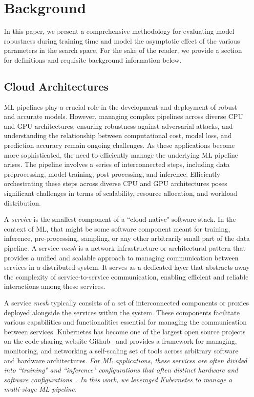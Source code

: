 \documentclass[conference]{IEEEtran}
\newcommand{\cm}[1]{\textit{{\color{blue}#1}}}
\begin{document}
\section{Background}
\label{background}



In this paper, we present a comprehensive methodology for evaluating model robustness during training time and model the asymptotic effect of the various parameters in the search space. For the sake of the reader, we provide a section for definitions and requisite background information below.


\subsection{Cloud Architectures}


ML pipelines play a crucial role in the development and deployment of robust and accurate models. However, managing complex pipelines across diverse CPU and GPU architectures, ensuring robustness against adversarial attacks, and understanding the relationship between computational cost, model loss, and prediction accuracy remain ongoing challenges.
As these applications become more sophisticated, the need to efficiently manage the underlying ML pipeline arises. The pipeline involves a series of interconnected steps, including data preprocessing, model training, post-processing, and inference. Efficiently orchestrating these steps across diverse CPU and GPU architectures poses significant challenges in terms of scalability, resource allocation, and workload distribution.

A \textit{service} is the smallest component of a ``cloud-native" software stack. In the context of ML, that might be some software component meant for training, inference, pre-processing, sampling, or any other arbitrarily small part of the data pipeline. A service \textit{mesh} is a network infrastructure or architectural pattern that provides a unified and scalable approach to managing communication between services in a distributed system. It serves as a dedicated layer that abstracts away the complexity of service-to-service communication, enabling efficient and reliable interactions among these services. 

A service \textit{mesh} typically consists of a set of interconnected components or proxies deployed alongside the services within the system. These components facilitate various capabilities and functionalities essential for managing the communication between services. Kubernetes has become one of the largest open source projects on the code-sharing website Github~\cite{k8s-size} and provides a framework for managing, monitoring, and networking a self-scaling set of tools across arbitrary software and hardware architectures. \cm{For ML applications, these services are often divided into ``training" and ``inference" configurations that often distinct hardware and software configurations~\cite{wang2019benchmarking}. In this work, we leveraged Kubernetes to manage a multi-stage ML pipeline.}
\end{document}
